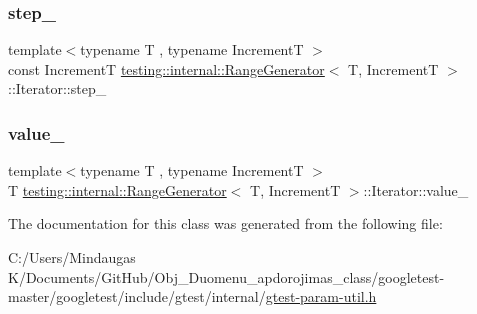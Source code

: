 \subsubsection{\texorpdfstring{step\_}{step\_}}
{\footnotesize\ttfamily template$<$typename T , typename IncrementT $>$ \\
const IncrementT \mbox{\hyperlink{classtesting_1_1internal_1_1_range_generator}{testing\+::internal\+::\+Range\+Generator}}$<$ T, IncrementT $>$\+::Iterator\+::step\+\_\+\hspace{0.3cm}{\ttfamily [private]}}

\mbox{\label{classtesting_1_1internal_1_1_range_generator_1_1_iterator_aab59a7070669d64348494a1fb1795934}} 
\subsubsection{\texorpdfstring{value\_}{value\_}}
{\footnotesize\ttfamily template$<$typename T , typename IncrementT $>$ \\
T \mbox{\hyperlink{classtesting_1_1internal_1_1_range_generator}{testing\+::internal\+::\+Range\+Generator}}$<$ T, IncrementT $>$\+::Iterator\+::value\+\_\+\hspace{0.3cm}{\ttfamily [private]}}



The documentation for this class was generated from the following file\+:\begin{DoxyCompactItemize}
\item 
C\+:/\+Users/\+Mindaugas K/\+Documents/\+Git\+Hub/\+Obj\+\_\+\+Duomenu\+\_\+apdorojimas\+\_\+class/googletest-\/master/googletest/include/gtest/internal/\mbox{\hyperlink{googletest-master_2googletest_2include_2gtest_2internal_2gtest-param-util_8h}{gtest-\/param-\/util.\+h}}\end{DoxyCompactItemize}
